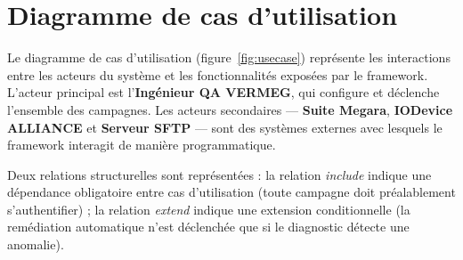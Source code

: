 \documentclass[12pt, a4paper]{report}
\begin{document}
\section{Diagramme de cas d'utilisation}

Le diagramme de cas d'utilisation (figure~\ref{fig:usecase}) représente les interactions entre les acteurs du système et les fonctionnalités exposées par le framework. L'acteur principal est l'\textbf{Ingénieur QA VERMEG}, qui configure et déclenche l'ensemble des campagnes. Les acteurs secondaires — \textbf{Suite Megara}, \textbf{IODevice ALLIANCE} et \textbf{Serveur SFTP} — sont des systèmes externes avec lesquels le framework interagit de manière programmatique.

Deux relations structurelles sont représentées : la relation \textit{include} indique une dépendance obligatoire entre cas d'utilisation (toute campagne doit préalablement s'authentifier) ; la relation \textit{extend} indique une extension conditionnelle (la remédiation automatique n'est déclenchée que si le diagnostic détecte une anomalie).
\end{document}
